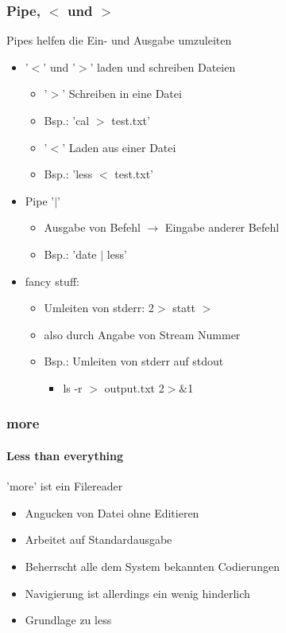 \documentclass[12pt,utf8]{beamer}
\begin{document}
\begin{frame}
\frametitle{Pipe, $<$ und $>$ }
Pipes helfen die Ein- und Ausgabe umzuleiten
\begin{itemize}[<+->]
	\item '$<$' und '$>$' laden und schreiben Dateien
	\begin{itemize}[<+->]
		\item '$>$' Schreiben in eine Datei
		\item Bsp.: 'cal $>$ test.txt'
		\item '$<$' Laden aus einer Datei
		\item Bsp.: 'less $<$ test.txt'
	\end{itemize}
	\item Pipe '$\mid$'
	\begin{itemize}[<+->]
		\item Ausgabe von Befehl $\to$ Eingabe anderer Befehl
		\item Bsp.: 'date $\mid$ less'
	\end{itemize}
	\item fancy stuff:
	\begin{itemize}[<+->]
		\item Umleiten von stderr: 2$>$ statt $>$
		\item also durch Angabe von Stream Nummer
		\item Bsp.: Umleiten von stderr auf stdout
		\begin{itemize}
			\item ls -r $>$ output.txt 2$>\&$1 
		\end{itemize}
	\end{itemize}
\end{itemize}
\end{frame}

\begin{frame}
\frametitle{more}
\framesubtitle{Less than everything}
'more' ist ein Filereader
\begin{itemize}
	\item Angucken von Datei ohne Editieren
	\item Arbeitet auf Standardausgabe
	\item Beherrscht alle dem System bekannten Codierungen
	\item Navigierung ist allerdings ein wenig hinderlich
	\item Grundlage zu less
\end{itemize}
\end{frame}
\end{document}
